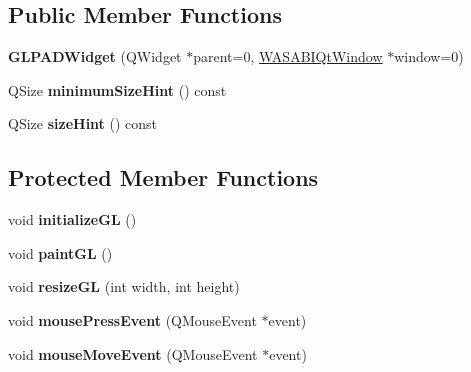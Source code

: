 \subsection*{\-Public \-Member \-Functions}
\begin{DoxyCompactItemize}
\item 
\hypertarget{class_g_l_p_a_d_widget_ac46a758a8aaac0aff683260782d2d5d1}{
{\bfseries \-G\-L\-P\-A\-D\-Widget} (\-Q\-Widget $\ast$parent=0, \hyperlink{class_w_a_s_a_b_i_qt_window}{\-W\-A\-S\-A\-B\-I\-Qt\-Window} $\ast$window=0)}
\label{class_g_l_p_a_d_widget_ac46a758a8aaac0aff683260782d2d5d1}

\item 
\hypertarget{class_g_l_p_a_d_widget_a44d6d10d576fe6f0d4103da48ef06d74}{
\-Q\-Size {\bfseries minimum\-Size\-Hint} () const }
\label{class_g_l_p_a_d_widget_a44d6d10d576fe6f0d4103da48ef06d74}

\item 
\hypertarget{class_g_l_p_a_d_widget_a14208eb95dd3ba3e5f1a7ef23a8dee37}{
\-Q\-Size {\bfseries size\-Hint} () const }
\label{class_g_l_p_a_d_widget_a14208eb95dd3ba3e5f1a7ef23a8dee37}

\end{DoxyCompactItemize}
\subsection*{\-Protected \-Member \-Functions}
\begin{DoxyCompactItemize}
\item 
\hypertarget{class_g_l_p_a_d_widget_a871467963305c08112a6305f5cd2ac51}{
void {\bfseries initialize\-G\-L} ()}
\label{class_g_l_p_a_d_widget_a871467963305c08112a6305f5cd2ac51}

\item 
\hypertarget{class_g_l_p_a_d_widget_ae8d5c9d5935e1be0dfe72f1830a530ce}{
void {\bfseries paint\-G\-L} ()}
\label{class_g_l_p_a_d_widget_ae8d5c9d5935e1be0dfe72f1830a530ce}

\item 
\hypertarget{class_g_l_p_a_d_widget_a9725f369b163897e526a14d3560cd0c4}{
void {\bfseries resize\-G\-L} (int width, int height)}
\label{class_g_l_p_a_d_widget_a9725f369b163897e526a14d3560cd0c4}

\item 
\hypertarget{class_g_l_p_a_d_widget_a238644b71745953a234fd9d2468f78ee}{
void {\bfseries mouse\-Press\-Event} (\-Q\-Mouse\-Event $\ast$event)}
\label{class_g_l_p_a_d_widget_a238644b71745953a234fd9d2468f78ee}

\item 
\hypertarget{class_g_l_p_a_d_widget_acec021785ddf5a9994a4524bd657ab85}{
void {\bfseries mouse\-Move\-Event} (\-Q\-Mouse\-Event $\ast$event)}
\label{class_g_l_p_a_d_widget_acec021785ddf5a9994a4524bd657ab85}

\end{DoxyCompactItemize}


